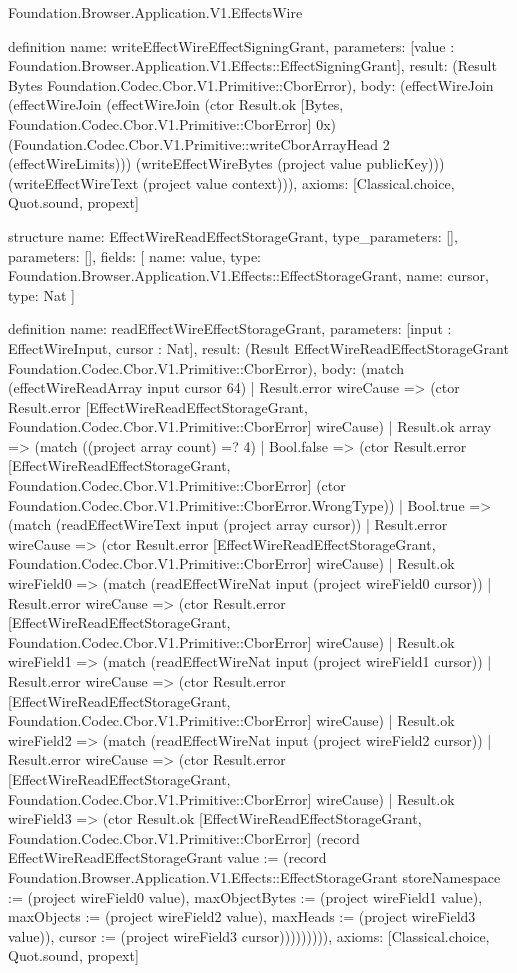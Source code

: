 \begin{lexlean}{Foundation.Browser.Application.V1.EffectsWire}
\begin{semanticmodule}
definition{
  name: writeEffectWireEffectSigningGrant,
  parameters: [value : Foundation.Browser.Application.V1.Effects::EffectSigningGrant],
  result: (Result Bytes Foundation.Codec.Cbor.V1.Primitive::CborError),
  body: (effectWireJoin (effectWireJoin (effectWireJoin (ctor Result.ok [Bytes, Foundation.Codec.Cbor.V1.Primitive::CborError] 0x) (Foundation.Codec.Cbor.V1.Primitive::writeCborArrayHead 2 (effectWireLimits))) (writeEffectWireBytes (project value publicKey))) (writeEffectWireText (project value context))),
  axioms: [Classical.choice, Quot.sound, propext]
}

structure{
  name: EffectWireReadEffectStorageGrant,
  type_parameters: [],
  parameters: [],
  fields: [
    {name: value, type: Foundation.Browser.Application.V1.Effects::EffectStorageGrant},
    {name: cursor, type: Nat}
  ]
}

definition{
  name: readEffectWireEffectStorageGrant,
  parameters: [input : EffectWireInput, cursor : Nat],
  result: (Result EffectWireReadEffectStorageGrant Foundation.Codec.Cbor.V1.Primitive::CborError),
  body: (match (effectWireReadArray input cursor 64)
    | Result.error wireCause => (ctor Result.error [EffectWireReadEffectStorageGrant, Foundation.Codec.Cbor.V1.Primitive::CborError] wireCause)
    | Result.ok array => (match ((project array count) =? 4)
      | Bool.false => (ctor Result.error [EffectWireReadEffectStorageGrant, Foundation.Codec.Cbor.V1.Primitive::CborError] (ctor Foundation.Codec.Cbor.V1.Primitive::CborError.WrongType))
      | Bool.true => (match (readEffectWireText input (project array cursor))
        | Result.error wireCause => (ctor Result.error [EffectWireReadEffectStorageGrant, Foundation.Codec.Cbor.V1.Primitive::CborError] wireCause)
        | Result.ok wireField0 => (match (readEffectWireNat input (project wireField0 cursor))
          | Result.error wireCause => (ctor Result.error [EffectWireReadEffectStorageGrant, Foundation.Codec.Cbor.V1.Primitive::CborError] wireCause)
          | Result.ok wireField1 => (match (readEffectWireNat input (project wireField1 cursor))
            | Result.error wireCause => (ctor Result.error [EffectWireReadEffectStorageGrant, Foundation.Codec.Cbor.V1.Primitive::CborError] wireCause)
            | Result.ok wireField2 => (match (readEffectWireNat input (project wireField2 cursor))
              | Result.error wireCause => (ctor Result.error [EffectWireReadEffectStorageGrant, Foundation.Codec.Cbor.V1.Primitive::CborError] wireCause)
              | Result.ok wireField3 => (ctor Result.ok [EffectWireReadEffectStorageGrant, Foundation.Codec.Cbor.V1.Primitive::CborError] (record EffectWireReadEffectStorageGrant {value := (record Foundation.Browser.Application.V1.Effects::EffectStorageGrant {storeNamespace := (project wireField0 value), maxObjectBytes := (project wireField1 value), maxObjects := (project wireField2 value), maxHeads := (project wireField3 value)}), cursor := (project wireField3 cursor)})))))))),
  axioms: [Classical.choice, Quot.sound, propext]
}


\end{semanticmodule}
\end{lexlean}
